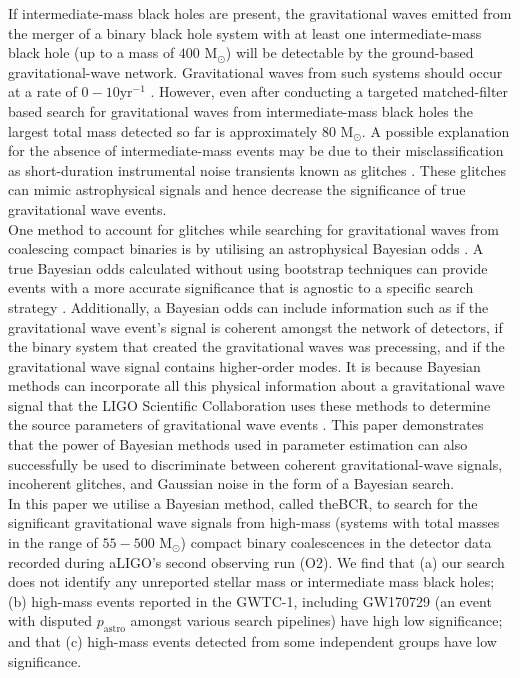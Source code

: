 \documentclass[%
 reprint,
 amsmath,amssymb,
 aps,
]{revtex4}
\newcommand{\bcr}{{\sc BCR}\xspace}
\newcommand{\msun}{{M${}_\odot$}\xspace}
\begin{document}
If intermediate-mass black holes are present, the gravitational waves emitted from the merger of a binary black hole system with at least one intermediate-mass black hole (up to a mass of $400$ \msun) will be detectable by the ground-based gravitational-wave network. Gravitational waves from such systems should occur at a rate of $0-10\text{yr}^{-1}$ \cite{fregeau2006imbhbRatePrediction, mandel2008rates,rodriguez2015bbhRatePredictions}.  However, even after conducting a targeted matched-filter based search for gravitational waves from intermediate-mass black holes the largest total mass detected so far is approximately $80$ \msun \cite{salemi2019search, abbott2019gwtc}. A possible explanation for the absence of intermediate-mass events may be due to their misclassification as short-duration instrumental noise transients known as glitches \cite{glitch_in_fifth_ligo_run, bayeswave, improving_dq_in_early_runs, ligo_glitch_gw150914, pycbc_short_duration_transients, pe_with_glitch, blip_glitches}. These glitches can mimic astrophysical signals and hence decrease the significance of true gravitational wave events. \\

One method to account for glitches while searching for gravitational waves from coalescing compact binaries is by utilising an astrophysical Bayesian odds  \cite{bci, BCR1, BCR2, bcr_gw151216, bayesian_odds}. A true Bayesian odds calculated without using bootstrap techniques can provide events with a more accurate significance that is agnostic to a specific search strategy \cite{BCR2, bcr_gw151216,  bayesian_odds}. Additionally, a Bayesian odds can include information such as if the gravitational wave event's signal is coherent amongst the network of detectors, if the binary system that created the gravitational waves was precessing, and if the gravitational wave signal contains higher-order modes.  It is because Bayesian methods can incorporate all this physical information about a gravitational wave signal that the LIGO Scientific Collaboration uses these methods to determine the source parameters of gravitational wave events \cite{abbott2016ligo, abbott2019gwtc}. This paper demonstrates that the power of Bayesian methods used in parameter estimation can also successfully be used to discriminate between coherent gravitational-wave signals, incoherent glitches, and Gaussian noise in the form of a Bayesian search. \\

 In this paper we utilise a Bayesian method, called the\bcr \cite{BCR1}, to search for the significant gravitational wave signals from high-mass (systems with total masses in the range of $55-500$ \msun) compact binary coalescences in the detector data recorded during aLIGO's second observing run (O2).  We find that (a) our search does not identify any unreported stellar mass or intermediate mass black holes; (b) high-mass events reported in the GWTC-1, including GW170729 (an event with disputed $p_\text{astro}$ amongst various search pipelines) have high low significance; and that (c) high-mass events detected from some independent groups have low significance. \\
\end{document}

